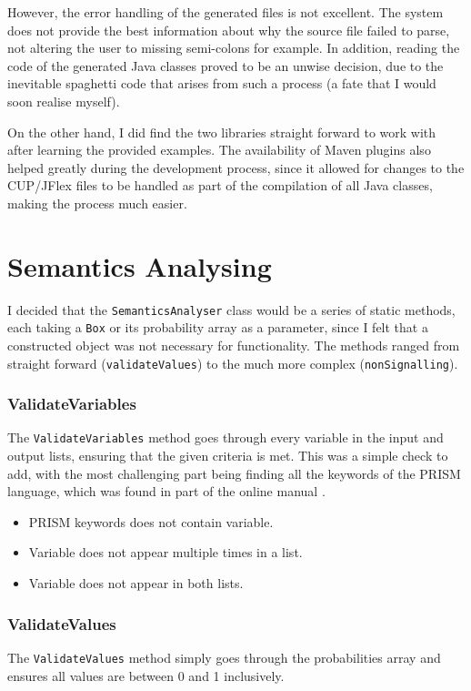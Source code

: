 \documentclass[report.tex]{subfiles}
\begin{document}
However, the error handling of the generated files is not excellent. The system
does not provide the best information about why the source file failed to parse,
not altering the user to missing semi-colons for example. In addition, reading
the code of the generated Java classes proved to be an unwise decision, due to
the inevitable spaghetti code that arises from such a process (a fate that I
would soon realise myself).

On the other hand, I did find the two libraries straight forward to work with
after learning the provided examples. The availability of Maven plugins also
helped greatly during the development process, since it allowed for changes to
the CUP/JFlex files to be handled as part of the compilation of all Java
classes, making the process much easier.

\section{Semantics Analysing} %
\label{sec:semantics_analysing}
I decided that the \texttt{SemanticsAnalyser} class would be a series of static
methods, each taking a \texttt{Box} or its probability array as a parameter,
since I felt that a constructed object was not necessary for functionality. The
methods ranged from straight forward (\texttt{validateValues}) to the much more
complex (\texttt{nonSignalling}).

\subsubsection{ValidateVariables} %
\label{ssub:validateVariables}
The \texttt{ValidateVariables} method goes through every variable in the input
and output lists, ensuring that the given criteria is met. This was a simple
check to add, with the most challenging part being finding all the keywords of
the PRISM language, which was found in part of the online manual
\cite{prism_keywords}.
\begin{itemize}
    \item PRISM keywords does not contain variable.
    \item Variable does not appear multiple times in a list.
    \item Variable does not appear in both lists.
\end{itemize}

\subsubsection{ValidateValues} %
\label{ssub:validatevalues}
The \texttt{ValidateValues} method simply goes through the probabilities array
and ensures all values are between 0 and 1 inclusively.
\end{document}
